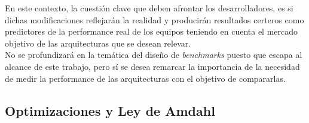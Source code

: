 En este contexto, la cuestión clave que deben afrontar los desarrolladores, es 
si dichas modificaciones reflejarán la realidad y producirán resultados 
certeros como predictores de la performance real de los equipos teniendo en 
cuenta el mercado objetivo de las arquitecturas que se desean relevar.\\
No se profundizará en la temática del diseño de \emph{benchmarks} puesto que 
escapa al alcance de este trabajo, pero sí se desea remarcar la importancia de 
la necesidad de medir la performance de las arquitecturas con el objetivo de 
compararlas.

\subsection{Optimizaciones y Ley de Amdahl}
\label{subsec:performance-optimizations_amdahl}

